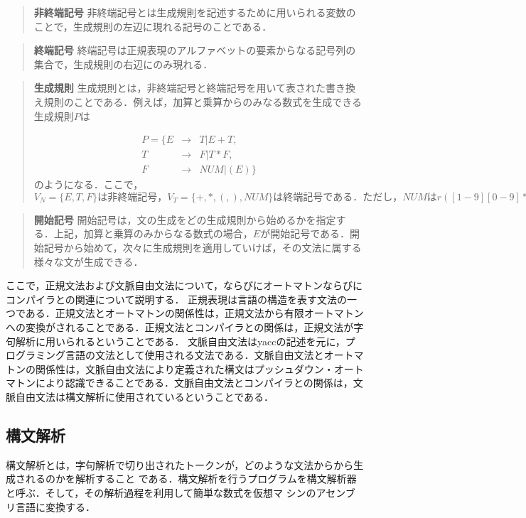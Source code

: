 \documentclass[a4j]{jsarticle}  %
\begin{document}
\begin{quote}
{\bf 非終端記号} 非終端記号とは生成規則を記述するために用いられる変数のことで，生成規則の左辺に現れる記号のことである．
\end{quote}

\begin{quote}
{\bf 終端記号} 終端記号は正規表現のアルファベットの要素からなる記号列の集合で，生成規則の右辺にのみ現れる．
\end{quote}

\begin{quote}
{\bf 生成規則} 生成規則とは，非終端記号と終端記号を用いて表された書き換え規則のことである．例えば，加算と乗算からのみなる数式を生成できる生成規則$P$は

\begin{eqnarray*}
P=\{E&→&T|E+T,\\
T&→&F|T*F,\\
F&→&NUM|(E)\}
\end{eqnarray*}
のようになる．ここで，$V_N=\{E,T,F\}は非終端記号，V_T=\{+,*,(,),NUM\}は終端記号である．ただし，NUMはr([1−9][0−9]*)のような正規表現で表される数に対応しているものとし，|は「または」を意味する．$
\end{quote}

\begin{quote}
{\bf 開始記号} 開始記号は，文の生成をどの生成規則から始めるかを指定する．上記，加算と乗算のみからなる数式の場合，$E$が開始記号である．開始記号から始めて，次々に生成規則を適用していけば，その文法に属する様々な文が生成できる．
\end{quote}

ここで，正規文法および文脈自由文法について，ならびにオートマトンならびにコンパイラとの関連について説明する． 
 正規表現は言語の構造を表す文法の一つである．正規文法とオートマトンの関係性は，正規文法から有限オートマトンへの変換がされることである．正規文法とコンパイラとの関係は，正規文法が字句解析に用いられるということである．
 文脈自由文法はyaccの記述を元に，プログラミング言語の文法として使用される文法である．文脈自由文法とオートマトンの関係性は，文脈自由文法により定義された構文はプッシュダウン・オートマトンにより認識できることである．文脈自由文法とコンパイラとの関係は，文脈自由文法は構文解析に使用されているということである．


\subsection{構文解析}
構文解析とは，字句解析で切り出されたトークンが，どのような文法からから生成されるのかを解析すること
である．構文解析を行うプログラムを構文解析器と呼ぶ．そして，その解析過程を利用して簡単な数式を仮想マ
シンのアセンブリ言語に変換する．
\end{document}
